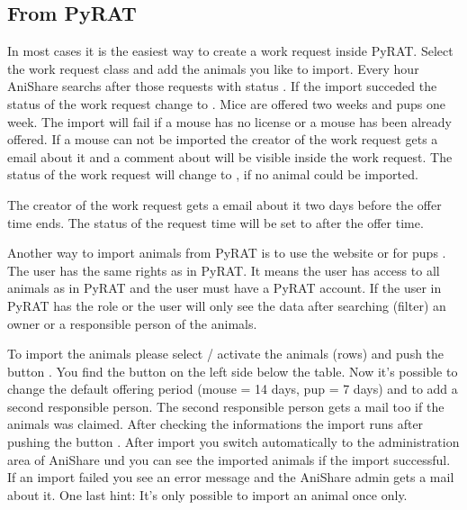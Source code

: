 \documentclass[letterpaper,10pt,openany,oneside,english]{sphinxmanual}
\begin{document}
\subsection{From PyRAT}
\label{\detokenize{index:from-pyrat}}
In most cases it is the easiest way to create a work request inside PyRAT. Select the work request class  and add the animals you like
to import. Every hour AniShare searchs after those requests with status . If the import succeded the status of the work request
change to . Mice are offered two weeks and pups one week. The import will fail if a mouse has no license or a mouse has been already offered. If a mouse can not be imported the
creator of the work request gets a email about it and a comment about will be visible inside the work request. The status of the work request will change to
, if no animal could be imported.

The creator of the work request gets a email about it two days before the offer time ends. The status of the request time will be set to
 after the offer time.

\noindent{}

Another way to import animals from PyRAT is to use the website  or for pups
. The user has the same rights as in PyRAT. It means the user has access to all animals
as in PyRAT and the user must have a PyRAT account. If the user in PyRAT has the role  or  the user will only
see the data after searching (filter) an owner or a responsible person of the animals.

\noindent{}

To import the animals please select / activate the animals (rows) and push the button . You find the button on the left
side below the table. Now it’s possible to change the default offering period (mouse = 14 days, pup = 7 days) and to add a second responsible person.
The second responsible person gets a mail too if the animals was claimed. After checking the informations the import runs after pushing the button
. After import you switch automatically to the administration area of AniShare und you can see the imported animals
if the import successful. If an import failed you see an error message and the AniShare admin gets a mail about it. One last hint: It’s only possible to
import an animal once only.
\end{document}
